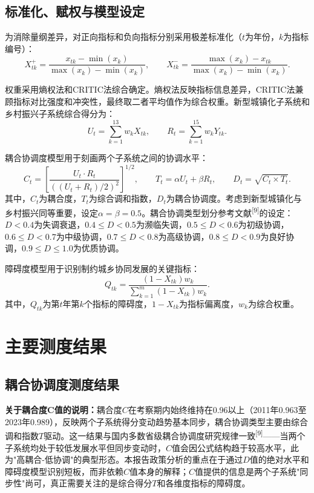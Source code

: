 \documentclass[UTF8,zihao=-4]{ctexart}
\begin{document}
\subsection{标准化、赋权与模型设定}

为消除量纲差异，对正向指标和负向指标分别采用极差标准化（$t$为年份，$k$为指标编号）：
\[
X_{tk}^{+}=\frac{x_{tk}-\min(x_k)}{\max(x_k)-\min(x_k)},\qquad
X_{tk}^{-}=\frac{\max(x_k)-x_{tk}}{\max(x_k)-\min(x_k)}.
\]

权重采用熵权法和CRITIC法综合确定。熵权法反映指标信息差异，CRITIC法兼顾指标对比强度和冲突性，最终取二者平均值作为综合权重。新型城镇化子系统和乡村振兴子系统综合得分为：
\[
U_t=\sum_{k=1}^{13}w_kX_{tk},\qquad R_t=\sum_{k=1}^{15}w_kY_{tk}.
\]

耦合协调度模型用于刻画两个子系统之间的协调水平：
\[
C_t=\left[\frac{U_t\cdot R_t}{\left((U_t+R_t)/2\right)^2}\right]^{1/2},\qquad
T_t=\alpha U_t+\beta R_t,\qquad D_t=\sqrt{C_t\times T_t}.
\]
其中，$C_t$为耦合度，$T_t$为综合调和指数，$D_t$为耦合协调度。考虑到新型城镇化与乡村振兴同等重要，设定$\alpha=\beta=0.5$。耦合协调类型划分参考文献\textsuperscript{[9]}的设定：$D<0.4$为失调衰退，$0.4\le D<0.5$为濒临失调，$0.5\le D<0.6$为初级协调，$0.6\le D<0.7$为中级协调，$0.7\le D<0.8$为高级协调，$0.8\le D<0.9$为良好协调，$0.9\le D\le1.0$为优质协调。

障碍度模型用于识别制约城乡协同发展的关键指标：
\[
Q_{tk}=\frac{(1-X_{tk})w_k}{\sum_{k=1}^{m}(1-X_{tk})w_k}.
\]
其中，$Q_{tk}$为第$t$年第$k$个指标的障碍度，$1-X_{tk}$为指标偏离度，$w_k$为综合权重。

\section{主要测度结果}

\subsection{耦合协调度测度结果}

\textbf{关于耦合度C值的说明：}耦合度$C$在考察期内始终维持在0.96以上（2011年0.963至2023年0.989），反映两个子系统得分变动趋势基本同步，耦合协调类型主要由综合调和指数$T$驱动。这一结果与国内多数省级耦合协调度研究规律一致\textsuperscript{[9]}——当两个子系统均处于较低发展水平但同步变动时，$C$值会因公式结构趋于较高水平，此为"高耦合-低协调"的典型形态。本报告政策分析的重点在于通过$D$值的绝对水平和障碍度模型识别短板，而非依赖$C$值本身的解释；$C$值提供的信息是两个子系统"同步性"尚可，真正需要关注的是综合得分$T$和各维度指标的障碍度。
\end{document}
